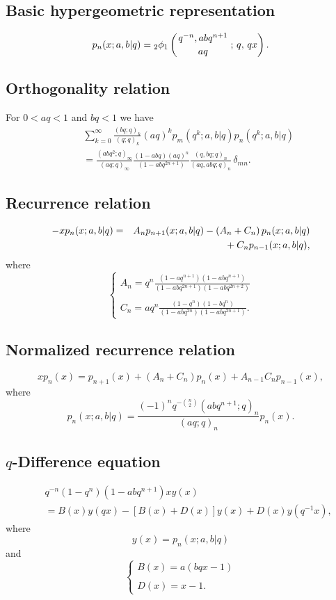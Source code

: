 \documentclass[envcountchap,graybox]{svmono}
\newcommand{\qhyp}[5]{\mbox{}_{#1}{\phi}_{#2}
\left(\genfrac{}{}{0pt}{}{#3}{#4}\,;\,q,\,#5\right)}
\newcommand{\mathindent}{\hspace{7.5mm}}
\newcommand{\qhyp}[5]{\,\mbox{}_{#1}\phi_{#2}\!\left(
  \genfrac{}{}{0pt}{}{#3}{#4};#5\right)}
\begin{document}
\subsection*{Basic hypergeometric representation}
\begin{equation}
\label{DefLittleqJacobi}
p_n(x;a,b|q)=\qhyp{2}{1}{q^{-n},abq^{n+1}}{aq}{qx}.
\end{equation}

\subsection*{Orthogonality relation}
For $0<aq<1$ and $bq<1$ we have
\begin{eqnarray}
\label{OrtLittleqJacobi}
& &\sum_{k=0}^{\infty}\frac{(bq;q)_k}{(q;q)_k}(aq)^kp_m(q^k;a,b|q)p_n(q^k;a,b|q)\nonumber\\
& &{}=\frac{(abq^2;q)_{\infty}}{(aq;q)_{\infty}}\frac{(1-abq)(aq)^n}{(1-abq^{2n+1})}
\frac{(q,bq;q)_n}{(aq,abq;q)_n}\,\delta_{mn}.
\end{eqnarray}

\subsection*{Recurrence relation}
\begin{eqnarray}
\label{RecLittleqJacobi}
-xp_n(x;a,b|q)&=&A_np_{n+1}(x;a,b|q)-\left(A_n+C_n\right)p_n(x;a,b|q)\nonumber\\
& &{}\mathindent{}+C_np_{n-1}(x;a,b|q),
\end{eqnarray}
where
$$\left\{\begin{array}{l}
\displaystyle A_n=q^n\frac{(1-aq^{n+1})(1-abq^{n+1})}{(1-abq^{2n+1})(1-abq^{2n+2})}\\
\\
\displaystyle C_n=aq^n\frac{(1-q^n)(1-bq^n)}{(1-abq^{2n})(1-abq^{2n+1})}.
\end{array}\right.$$

\subsection*{Normalized recurrence relation}
\begin{equation}
\label{NormRecLittleqJacobi}
xp_n(x)=p_{n+1}(x)+(A_n+C_n)p_n(x)+A_{n-1}C_np_{n-1}(x),\end{equation}
where
$$p_n(x;a,b|q)=\frac{(-1)^nq^{-\binom{n}{2}}(abq^{n+1};q)_n}{(aq;q)_n}p_n(x).$$

\subsection*{$q$-Difference equation}
\begin{eqnarray}
\label{dvLittleqJacobi}
& &q^{-n}(1-q^n)(1-abq^{n+1})xy(x)\nonumber\\
& &{}=B(x)y(qx)-\left[B(x)+D(x)\right]y(x)+D(x)y(q^{-1}x),
\end{eqnarray}
where
$$y(x)=p_n(x;a,b|q)$$
and
$$\left\{\begin{array}{l}\displaystyle B(x)=a(bqx-1)\\
\\
\displaystyle D(x)=x-1.\end{array}\right.$$
\end{document}
